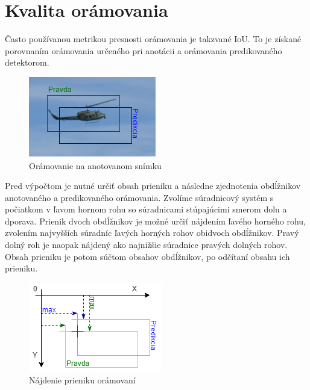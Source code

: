     \section{Kvalita orámovania}
        Často používanou metrikou presnosti orámovania je takzvané \ac{IoU}. To je získané porovnaním orámovania určeného pri anotácii a orámovania predikovaného detektorom.

        \begin{figure}[h]
            \centering
            \includegraphics[width=.6\textwidth]{obrazky/metrics/detection.drawio.png}
            \caption{Orámovanie na anotovanom snímku}
        \end{figure}

        Pred výpočtom je nutné určiť obsah prieniku a následne zjednotenia obdĺžnikov anotovaného a predikovaného orámovania. Zvolíme súradnicový systém s počiatkom v ľavom hornom rohu so súradnicami stúpajúcimi smerom dolu a dporava. Prienik dvoch obdĺžnikov je možné určiť nájdením ľavého horného rohu, zvolením najvyšších súradníc ľavých horných rohov obidvoch obdĺžnikov. Pravý dolný roh je naopak nájdený ako najnižšie súradnice pravých dolných rohov. Obsah prieniku je potom súčtom obsahov obdĺžnikov, po odčítaní obsahu ich prieniku.

        \begin{figure}[h]
            \centering
            \includegraphics[width=.4\textwidth]{obrazky/metrics/find intersection.drawio.png}
            \caption{Nájdenie prieniku orámovaní}
        \end{figure}

